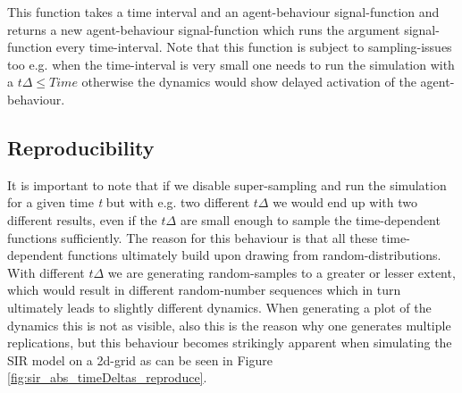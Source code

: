 This function takes a time interval and an agent-behaviour signal-function and returns a new agent-behaviour signal-function which runs the argument signal-function every time-interval. Note that this function is subject to sampling-issues too e.g. when the time-interval is very small one needs to run the simulation with a $t\Delta \leq Time$ otherwise the dynamics would show delayed activation of the agent-behaviour.

\subsection{Reproducibility}
It is important to note that if we disable super-sampling and run the simulation for a given time \textit{t} but with e.g. two different $t\Delta$ we would end up with two different results, even if the $t\Delta$ are small enough to sample the time-dependent functions sufficiently.
The reason for this behaviour is that all these time-dependent functions ultimately build upon drawing from random-distributions. With different $t\Delta$ we are generating random-samples to a greater or lesser extent, which would result in different random-number sequences which in turn ultimately leads to slightly different dynamics. When generating a plot of the dynamics this is not as visible, also this is the reason why one generates multiple replications, but this behaviour becomes strikingly apparent when simulating the SIR model on a 2d-grid as can be seen in Figure \ref{fig:sir_abs_timeDeltas_reproduce}.

